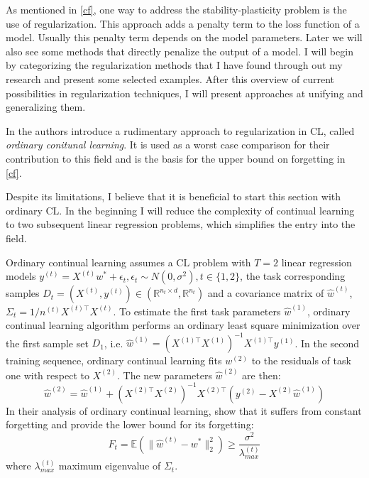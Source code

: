As mentioned in \autoref{cf}, one way to address the stability-plasticity problem is the use of regularization. This approach adds a penalty term to the loss function of a model. Usually this penalty term depends on the model parameters. Later we will also see some methods that directly penalize the output of a model. I will begin by categorizing the regularization methods that I have found through out my research and present some selected examples. After this overview of current possibilities in regularization techniques, I will present approaches at unifying and generalizing them.

In \cite{evron2022,li2024fixeddesignanalysisregularizationbased} the authors introduce a rudimentary approach to regularization in CL, called \textit{ordinary conitunal learning}. It is used as a worst case comparison for their contribution to this field and is the basis for the upper bound on forgetting in \autoref{cf}.

Despite its limitations, I believe that it is beneficial to start this section with ordinary CL. In the beginning I will reduce the complexity of continual learning to two subsequent linear regression problems, which simplifies the entry into the field.

Ordinary continual learning \cite{evron2022,li2024fixeddesignanalysisregularizationbased, zhao2024statisticaltheoryregularizationbasedcontinual} assumes a CL problem with $T=2$ linear regression models $y^{(t)} = X^{(t)}w^* + \epsilon_t, \epsilon_t \sim N(0, \sigma^2), t \in \{1,2\}$, the task corresponding samples $D_t = (X^{(t)}, y^{(t)}) \in (\mathbb{R}^{n_t \times d}, \mathbb{R}^{n_t})$ and a covariance matrix of $\hat{w}^{(t)}$, $\Sigma_t = 1/n^{(t)} X^{(t)\top} X^{(t)}$. To estimate the first task parameters $\hat{w}^{(1)}$, ordinary continual learning algorithm performs an ordinary least square minimization over the first sample set $D_1$, i.e. $\hat{w}^{(1)} = (X^{(1)\top}X^{(1)})^{-1}X^{(1)\top} y^{(1)}$. In the second training sequence, ordinary continual learning fits $w^{(2)}$ to the residuals of task one with respect to $X^{(2)}$. The new parameters $\hat{w}^{(2)}$ are then:
\begin{equation}
	\hat{w}^{(2)} = \hat{w}^{(1)} + (X^{(2)\top}X^{(2)})^{-1}X^{(2)\top} (y^{(2)} - X^{(2)}\hat{w}^{(1)})
\end{equation}
In their analysis of ordinary continual learning,\citeauthor{zhao2024statisticaltheoryregularizationbasedcontinual} \cite{zhao2024statisticaltheoryregularizationbasedcontinual} show that it suffers from constant forgetting and provide the lower bound for its forgetting:
\begin{equation}
	F_t = \mathbb{E}(\lVert \hat{w}^{(t)} - w^* \rVert_2^2) \geq \frac{\sigma^2}{\lambda_{max}^{(t)}}
\end{equation}
where $\lambda_{max}^{(t)}$ maximum eigenvalue of $\Sigma_t$.

